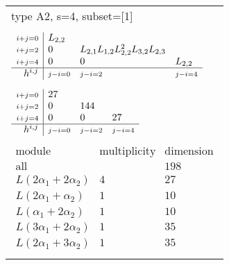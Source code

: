 \documentclass[crop,border=2mm]{standalone}
\begin{document}
\begin{tabular}{l}
{\huge type A2, s=4, subset=[1]}\\ \\


$\displaystyle
\begin{array}{r|l l l}
	{\scriptstyle i+j=0}&L_{2,2}&&\\
	{\scriptstyle i+j=2}&0&L_{2,1}L_{1,2}L_{2,2}^{2}L_{3,2}L_{2,3}&\\
	{\scriptstyle i+j=4}&0&0&L_{2,2}\\
	\hline h^{i,j}&{\scriptstyle j-i=0}&{\scriptstyle j-i=2}&{\scriptstyle j-i=4}
\end{array}
$ \\ \\


$\displaystyle
\begin{array}{r|l l l}
	{\scriptstyle i+j=0}&27&&\\
	{\scriptstyle i+j=2}&0&144&\\
	{\scriptstyle i+j=4}&0&0&27\\
	\hline h^{i,j}&{\scriptstyle j-i=0}&{\scriptstyle j-i=2}&{\scriptstyle j-i=4}
\end{array}
$ \\ \\


$\displaystyle
\begin{array}{rll}
	\text{module}&\text{multiplicity}&\text{dimension} \\ \hline \text{all}&&198 \\
	L\left( 2\alpha_{1}+ 2\alpha_{2}\right)&4&27\\
	L\left( 2\alpha_{1}+\alpha_{2}\right)&1&10\\
	L\left(\alpha_{1}+ 2\alpha_{2}\right)&1&10\\
	L\left( 3\alpha_{1}+ 2\alpha_{2}\right)&1&35\\
	L\left( 2\alpha_{1}+ 3\alpha_{2}\right)&1&35
\end{array}
$ \\ \\

\end{tabular}
\end{document}
